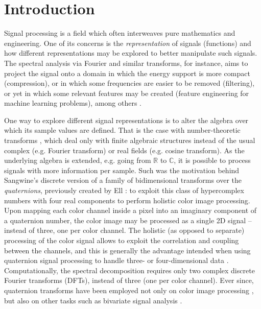 \chapter{Introduction}

Signal processing is a field which often interweaves pure mathematics and engineering. One of its concerns is the \textit{representation} of signals (functions) and how different representations may be explored to better manipulate such signals. The spectral analysis via Fourier and similar transforms, for instance, aims to project the signal onto a domain in which the energy support is more compact (compression), or in which some frequencies are easier to be removed (filtering), or yet in which some relevant features may be created (feature engineering for machine learning problems), among others \cite{oppenheim1999discrete, rabiner2010theory, graf2015features, vergin1999generalized}.

One way to explore different signal representations is to alter the algebra over which its sample values are defined. That is the case with number-theoretic transforms \cite{blahut2010fast,pedrouzo2017number,chandra2014exact}, which deal only with finite algebraic structures instead of the usual complex (e.g. Fourier transform) or real fields (e.g. cosine transform). As the underlying algebra is extended, e.g. going from $ \mathbb{R} $ to $ \mathbb{C} $, it is possible to process signals with more information per sample. Such was the motivation behind Sangwine's \cite{sangwine1996fourier} discrete version of a family of bidimensional transforms over the \textit{quaternions}, previously created by Ell \cite{ell1993quaternion}: to exploit this class of hypercomplex numbers with four real components to perform holistic color image processing. Upon mapping each color channel inside a pixel into an imaginary component of a quaternion number, the color image may be processed as a single 2D signal -- instead of three, one per color channel. The holistic (as opposed to separate) processing of the color signal allows to exploit the correlation and coupling between the channels, and this is generally the advantage intended when using quaternion signal processing to handle three- or four-dimensional data \cite{took2008quaternion}. Computationally, the spectral decomposition requires only two complex discrete Fourier transforms (DFTs), instead of three (one per color channel). Ever since, quaternion transforms have been employed not only on color image processing \cite{ell2007hypercomplex,chen2018quaternion,li2013quaternion,evans2000hypercomplex}, but also on other tasks such as bivariate signal analysis \cite{flamant2017spectral,flamant2017time,flamant2018complete}.


